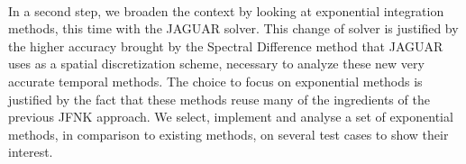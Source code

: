     \paragraph{}
    In a second step, we broaden the context by looking at exponential integration methods, this time with the JAGUAR solver.
    This change of solver is justified by the higher accuracy brought by the Spectral Difference method that JAGUAR uses as a spatial discretization scheme, necessary to analyze these new very accurate temporal methods.
    The choice to focus on exponential methods is justified by the fact that these methods reuse many of the ingredients of the previous JFNK approach.
    We select, implement and analyse a set of exponential methods, in comparison to existing methods, on several test cases to show their interest.






